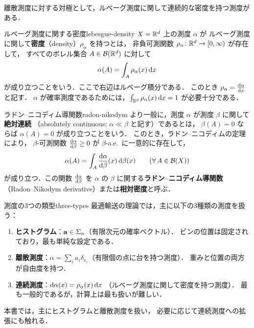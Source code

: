 離散測度に対する対極として，ルベーグ測度に関して連続的な密度を持つ測度がある．

\begin{definition}{ルベーグ測度に関する密度}{lebesgue-density}
  $X = \mathbb{R}^d$ 上の測度 $\alpha$ が
  ルベーグ測度に関して\textbf{密度}（density）$\rho_\alpha$ を持つとは，
  非負可測関数 $\rho_\alpha \colon \mathbb{R}^d \to [0, \infty)$ が存在して，
  すべてのボレル集合 $A \in \mathcal{B}(\mathbb{R}^d)$ に対して
  \[
    \alpha(A) = \int_A \rho_\alpha(x) \, \mathrm{d} x
  \]
  が成り立つことをいう．ここで右辺はルベーグ積分である．
  このとき $\rho_\alpha = \frac{\mathrm{d}\alpha}{\mathrm{d} x}$ と記す．
  $\alpha$ が確率測度であるためには，$\int_{\mathbb{R}^d} \rho_\alpha(x) \, \mathrm{d} x = 1$ が必要十分である．
\end{definition}

\begin{definition}{ラドン--ニコディム導関数}{radon-nikodym}
  より一般に，測度 $\alpha$ が測度 $\beta$ に関して\textbf{絶対連続}
  （absolutely continuous; $\alpha \ll \beta$ と記す）であるとは，
  $\beta(A) = 0$ ならば $\alpha(A) = 0$ が成り立つことをいう．
  このとき，ラドン--ニコディムの定理により，
  $\beta$-可測関数 $\frac{\mathrm{d}\alpha}{\mathrm{d}\beta} \geq 0$ が $\beta$-a.e.\ に一意的に存在して，
  \[
    \alpha(A) = \int_A \frac{\mathrm{d}\alpha}{\mathrm{d}\beta}(x) \, \mathrm{d}\beta(x)
    \qquad (\forall\, A \in \mathcal{B}(X))
  \]
  が成り立つ．この関数 $\frac{\mathrm{d}\alpha}{\mathrm{d}\beta}$ を
  $\alpha$ の $\beta$ に関する\textbf{ラドン--ニコディム導関数}
  （Radon--Nikodym derivative）または\textbf{相対密度}と呼ぶ．
\end{definition}

\begin{remark}{測度の3つの類型}{three-types}
  最適輸送の理論では，主に以下の3種類の測度を扱う：
  \begin{enumerate}
    \item \textbf{ヒストグラム}：$\mathbf{a} \in \Sigma_n$（有限次元の確率ベクトル）．
      ビンの位置は固定されており，最も単純な設定である．
    \item \textbf{離散測度}：$\alpha = \sum_i a_i \delta_{x_i}$（有限個の点に台を持つ測度）．
      重みと位置の両方が自由度を持つ．
    \item \textbf{連続測度}：$\mathrm{d}\alpha(x) = \rho_\alpha(x) \, \mathrm{d} x$
      （ルベーグ測度に関して密度を持つ測度）．
      最も一般的であるが，計算上は最も扱いが難しい．
  \end{enumerate}
  本書では，主にヒストグラムと離散測度を扱い，
  必要に応じて連続測度への拡張にも触れる．
\end{remark}

